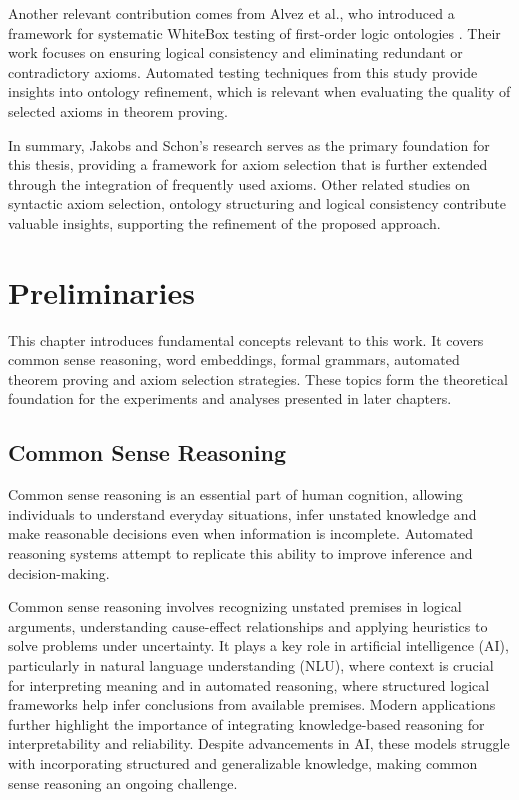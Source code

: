 \documentclass[english,version-2020-11]{uzl-thesis}
\begin{document}
Another relevant contribution comes from Alvez et al., who introduced a framework for systematic WhiteBox testing of first-order logic ontologies \cite{Alvez2017}. Their work focuses on ensuring logical consistency and eliminating redundant or contradictory axioms. Automated testing techniques from this study provide insights into ontology refinement, which is relevant when evaluating the quality of selected axioms in theorem proving.

In summary, Jakobs and Schon's research serves as the primary foundation for this thesis, providing a framework for axiom selection that is further extended through the integration of frequently used axioms. Other related studies on syntactic axiom selection, ontology structuring and logical consistency contribute valuable insights, supporting the refinement of the proposed approach.


\chapter{Preliminaries}
\label{chapter-preliminaries}

This chapter introduces fundamental concepts relevant to this work. It covers common sense reasoning, word embeddings, formal grammars, automated theorem proving and axiom selection strategies. These topics form the theoretical foundation for the experiments and analyses presented in later chapters.

\section{Common Sense Reasoning}

Common sense reasoning is an essential part of human cognition, allowing individuals to understand everyday situations, infer unstated knowledge and make reasonable decisions even when information is incomplete. Automated reasoning systems attempt to replicate this ability to improve inference and decision-making.

Common sense reasoning involves recognizing unstated premises in logical arguments, understanding cause-effect relationships and applying heuristics to solve problems under uncertainty. It plays a key role in artificial intelligence (AI), particularly in natural language understanding (NLU), where context is crucial for interpreting meaning and in automated reasoning, where structured logical frameworks help infer conclusions from available premises. Modern applications further highlight the importance of integrating knowledge-based reasoning for interpretability and reliability. Despite advancements in AI, these models struggle with incorporating structured and generalizable knowledge, making common sense reasoning an ongoing challenge.
\end{document}
